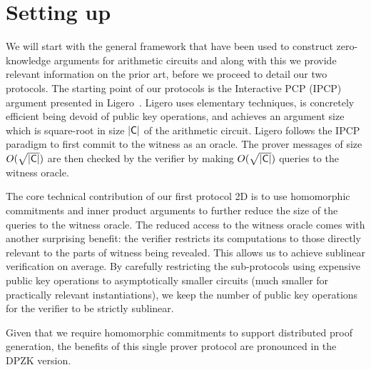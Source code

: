\section{Setting up \name{}} 
We will start with the general framework that have been used to construct zero-knowledge arguments for arithmetic circuits and along with this we provide relevant information on the prior art, before we proceed to detail our two protocols.
The starting point of our protocols is the Interactive PCP (IPCP) argument presented in Ligero~\cite{ligero}.
Ligero uses elementary techniques, is concretely
efficient being devoid of public key operations, and achieves an argument
size which is square-root in size $\mathsf{|C|}$ of the arithmetic circuit. Ligero follows the IPCP paradigm
to first commit to the witness as an oracle. The prover messages of size $O(\sqrt{\mathsf{|C|}})$ are then checked by the verifier by making $O(\sqrt{\mathsf{|C|}})$ queries to the witness oracle.

The core technical
contribution of our first protocol \name2D{} is to use homomorphic commitments and inner product arguments to 
further reduce the size of the queries to the witness oracle. The
reduced access to the witness oracle comes with another surprising benefit: the
verifier restricts its computations to those directly relevant to the parts of
witness being revealed. This allows us to achieve sublinear verification on
average. By carefully restricting the sub-protocols using expensive public key
operations to asymptotically smaller circuits (much smaller for practically
relevant instantiations), we keep the number of public key operations for the
verifier to be strictly sublinear.

Given that we require homomorphic commitments to support distributed proof generation,
the benefits of this single prover protocol are pronounced in the DPZK version.
    
